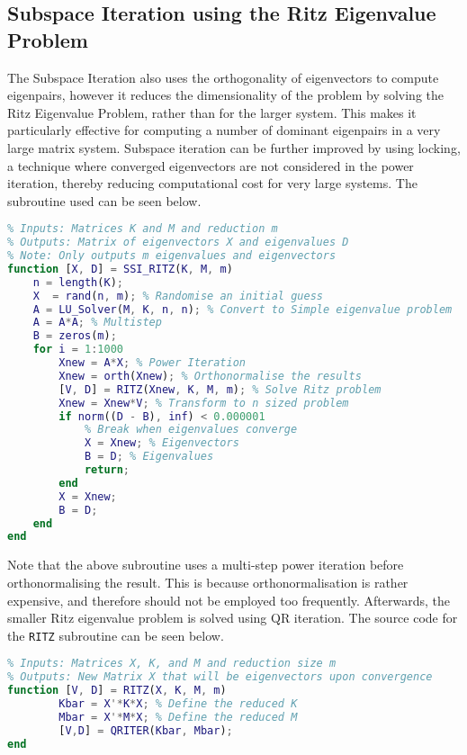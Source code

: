 \documentclass[11pt,oneside]{article}
\begin{document}
\subsection*{Subspace Iteration using the Ritz Eigenvalue Problem}

The Subspace Iteration also uses the orthogonality of eigenvectors to compute eigenpairs, however it reduces the dimensionality of the problem by solving the Ritz Eigenvalue Problem, rather than for the larger system. This makes it particularly effective for computing a number of dominant eigenpairs in a very large matrix system. Subspace iteration can be further improved by using locking, a technique where converged eigenvectors are not considered in the power iteration, thereby reducing computational cost for very large systems. The subroutine used can be seen below.

\begin{lstlisting}[language=Matlab]
%% Subspace Iteration Function
% Inputs: Matrices K and M and reduction m
% Outputs: Matrix of eigenvectors X and eigenvalues D
% Note: Only outputs m eigenvalues and eigenvectors
function [X, D] = SSI_RITZ(K, M, m)
    n = length(K);
    X  = rand(n, m); % Randomise an initial guess
    A = LU_Solver(M, K, n, n); % Convert to Simple eigenvalue problem
    A = A*A; % Multistep 
    B = zeros(m);
    for i = 1:1000
        Xnew = A*X; % Power Iteration
        Xnew = orth(Xnew); % Orthonormalise the results
        [V, D] = RITZ(Xnew, K, M, m); % Solve Ritz problem
        Xnew = Xnew*V; % Transform to n sized problem
        if norm((D - B), inf) < 0.000001 
            % Break when eigenvalues converge
            X = Xnew; % Eigenvectors
            B = D; % Eigenvalues
            return;
        end
        X = Xnew;
        B = D;
    end
end
\end{lstlisting}

Note that the above subroutine uses a multi-step power iteration before orthonormalising the result. This is because orthonormalisation is rather expensive, and therefore should not be employed too frequently. Afterwards, the smaller Ritz eigenvalue problem is solved using QR iteration. The source code for the \texttt{RITZ} subroutine can be seen below.

\begin{lstlisting}[language=Matlab]
%% Function to perform Ritz Reduction
% Inputs: Matrices X, K, and M and reduction size m
% Outputs: New Matrix X that will be eigenvectors upon convergence
function [V, D] = RITZ(X, K, M, m)
        Kbar = X'*K*X; % Define the reduced K
        Mbar = X'*M*X; % Define the reduced M
        [V,D] = QRITER(Kbar, Mbar);
end
\end{lstlisting}
\end{document}
